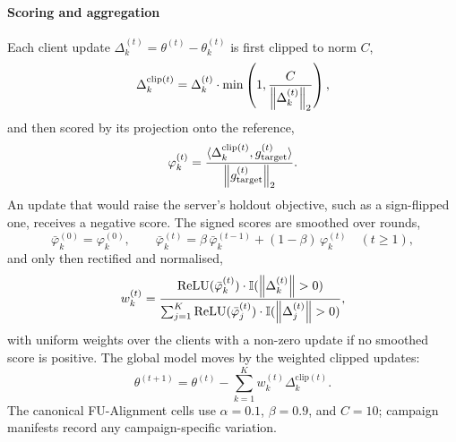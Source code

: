 \paragraph{Scoring and aggregation}
Each client update $\Delta_k^{(t)} = \theta^{(t)} - \theta_k^{(t)}$ is first clipped to norm $C$,
\begin{equation}
\label{eq:clip_pre_score}
\Delta_k^{\mathrm{clip}(t)} = \Delta_k^{(t)} \cdot \min\left(1, \frac{C}{\left\lVert \Delta_k^{(t)} \right\rVert_2}\right),
\end{equation}
and then scored by its projection onto the reference,
\begin{equation}
\label{eq:score_raw}
\varphi_k^{(t)} = \frac{\langle \Delta_k^{\mathrm{clip}(t)}, g_{\mathrm{target}}^{(t)} \rangle}{\left\lVert g_{\mathrm{target}}^{(t)} \right\rVert_2}.
\end{equation}
An update that would raise the server's holdout objective, such as a sign-flipped one, receives a negative score. The signed scores are smoothed over rounds,
\begin{equation}
\label{eq:ema_smooth}
\bar{\varphi}_k^{(0)} = \varphi_k^{(0)}, \qquad \bar{\varphi}_k^{(t)} = \beta\, \bar{\varphi}_k^{(t-1)} + (1-\beta)\, \varphi_k^{(t)} \quad (t \ge 1),
\end{equation}
and only then rectified and normalised,
\begin{equation}
\label{eq:weights_simplex}
w_k^{(t)} = \frac{\operatorname{ReLU}(\bar{\varphi}_k^{(t)}) \cdot \mathbb{I}(\left\lVert \Delta_k^{(t)} \right\rVert > 0)}{\sum_{j=1}^K \operatorname{ReLU}(\bar{\varphi}_j^{(t)}) \cdot \mathbb{I}(\left\lVert \Delta_j^{(t)} \right\rVert > 0)},
\end{equation}
with uniform weights over the clients with a non-zero update if no smoothed score is positive. The global model moves by the weighted clipped updates:
\begin{equation}
\label{eq:model_update}
\theta^{(t+1)} = \theta^{(t)} - \sum_{k=1}^K w_k^{(t)} \Delta_k^{\mathrm{clip}(t)}.
\end{equation}
The canonical FU-Alignment cells use $\alpha = 0.1$, $\beta = 0.9$, and $C = 10$; campaign manifests record any campaign-specific variation.

